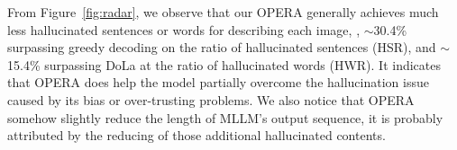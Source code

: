 \documentclass[10pt,twocolumn,letterpaper]{article}
\newcommand{\Fref}[1]{Figure~\ref{#1}}
\begin{document}
From \Fref{fig:radar}, we observe that our OPERA generally achieves much less hallucinated sentences or words for describing each image, \eg, $\sim$30.4\% surpassing greedy decoding on the ratio of hallucinated sentences (HSR), and $\sim$15.4\% surpassing DoLa at the ratio of hallucinated words (HWR). 
It indicates that OPERA does help the model partially overcome the hallucination issue caused by its bias or over-trusting problems. 
We also notice that OPERA somehow slightly reduce the length of MLLM's output sequence, it is probably attributed by the reducing of those additional hallucinated contents. 



\begin{table}[t]
\vspace{-0.5em}
    \footnotesize
    \centering
    \vspace{-0.5em}
    \caption{GPT-4V assisted hallucination evaluation results on MSCOCO. Two aspects are verified, \ie, correctness ($C$) and detailedness ($D$). Higher correctness indicates less hallucinations.}
    \label{tab:gpt_4v}
\end{table}
\end{document}
